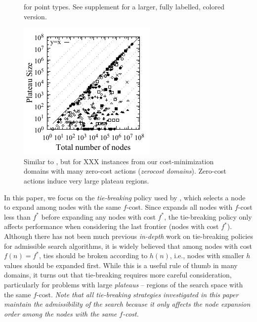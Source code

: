 \begin{figure}[bt]
\begin{minipage}[t]{\minilength}
{  for point types. See supplement for a larger, fully
  labelled, colored version.
  }
  \label{plateau}
 \end{minipage} 
 \hfill
 \begin{minipage}[t]{0.23\textwidth}
  \centering
  \includegraphics{tables/aaai16-frontier/zerocost/lmcut_frontier-front-mono.pdf}
  \caption{Similar to , but for XXX instances from our cost-minimization
  domains with many zero-cost actions (\emph{zerocost domains}).
  Zero-cost actions induce very large plateau regions.
 }
 \label{plateau-zerocost}
 \end{minipage} 
\end{figure}

In this paper, we focus on the \emph{tie-breaking} policy used by
\astar, which selects a node to expand among nodes with the same
$f$-cost.  Since \astar expands all nodes with $f$-cost less than $f^*$
before expanding any nodes with cost $f^*$, the tie-breaking policy only
affects performance when considering the last frontier (nodes with cost
$f^*$).  Although there has not been much previous \emph{in-depth} work
on tie-breaking policies for admissible search algorithms, it is widely believed that among nodes with
cost $f(n) = f^*$, ties should be broken according to $h(n)$, i.e.,
nodes with smaller $h$ values should be expanded first.  While this is a
useful rule of thumb in many domains, it turns out that tie-breaking
requires more careful consideration, particularly for problems with
large \emph{plateaus} -- regions of the search space with the same $f$-cost.
\emph{Note that all tie-breaking strategies investigated in this paper
maintain the admissibility of the search because it only affects the node expansion
order among the nodes with the same $f$-cost.}

